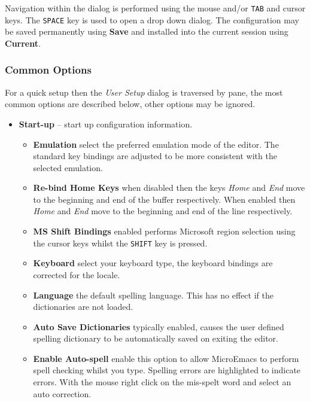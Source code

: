 \documentclass[11pt,a4paper,pdftex]{article}
\begin{document}
  Navigation within the dialog is performed using the mouse and/or
  \texttt{TAB} and cursor keys. The \texttt{SPACE} key is used to open a drop
  down dialog. The configuration may be saved permanently using \textbf{Save}
  and installed into the current session using \textbf{Current}.

\subsubsection{Common Options}

  For a quick setup then the \textit{User Setup} dialog is traversed by pane,
  the most common options are described below, other options may be ignored.

  \begin{itemize}
    \item \textbf{Start-up} -- start up configuration information.

    \begin{itemize}

      \item \textbf{Emulation} select the preferred emulation mode of the
      editor. The standard key bindings are adjusted to be more consistent
      with the selected emulation.

      \item \textbf{Re-bind Home Keys} when disabled then the keys
      \textit{Home} and \textit{End} move to the beginning and end of the
      buffer respectively. When enabled then \textit{Home} and \textit{End}
      move to the beginning and end of the line respectively.

      \item \textbf{MS Shift Bindings} enabled performs Microsoft region
      selection using the cursor keys whilst the \texttt{SHIFT} key is
      pressed.

      \item \textbf{Keyboard} select your keyboard type, the keyboard bindings
      are corrected for the locale.

      \item \textbf{Language} the default spelling language. This has no
      effect if the dictionaries are not loaded.

      \item \textbf{Auto Save Dictionaries} typically enabled, causes the user
      defined spelling dictionary to be automatically saved on exiting the
      editor.

      \item \textbf{Enable Auto-spell} enable this option to allow MicroEmacs
      to perform spell checking whilst you type. Spelling errors are
      highlighted to indicate errors. With the mouse right click on the
      mis-spelt word and select an auto correction.


\end{itemize}
\end{itemize}
\end{document}
